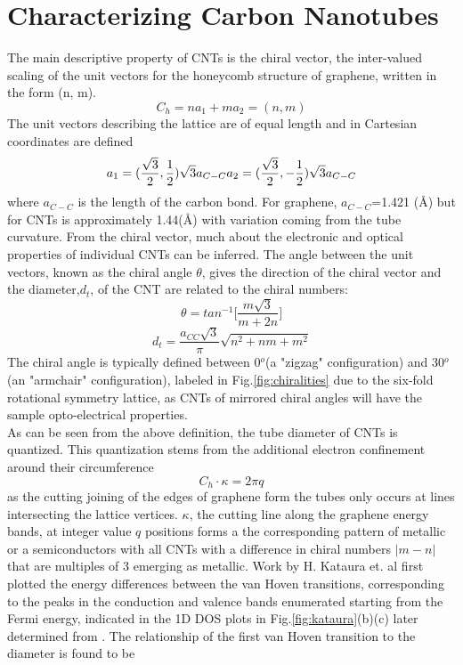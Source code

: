 \section{Characterizing Carbon Nanotubes}
The main descriptive property of CNTs is the chiral vector, the  inter-valued scaling of the unit vectors for the honeycomb structure of graphene, written in the form (n, m).
\begin{equation}
	C_h = na_1 + ma_2 = (n, m)
\end{equation}
The unit vectors describing the lattice are of equal length and in Cartesian coordinates are defined
\begin{equation}
	a_1 = (\frac{\sqrt3}{2}, \frac{1}{2})\sqrt{3}a_{C-C}\\
	a_2 = (\frac{\sqrt3}{2}, -\frac{1}{2})\sqrt{3}a_{C-C}
	\label{unit_vecs}
\end{equation}
 where $a_{C-C}$ is the length of the carbon bond. For graphene,  $a_{C-C}$=1.421 (\AA) but for CNTs is approximately 1.44(\AA) with variation coming from the tube curvature\cite{saito}. From the chiral vector, much about the electronic and optical properties of individual CNTs can be inferred. The angle between the unit vectors, known as the chiral angle $\theta$, gives the direction of the chiral vector and the diameter,$d_t$, of the CNT are related to the chiral numbers:
\begin{equation}
	\theta = tan^{-1}\Bigg[\frac{m\sqrt{3}}{m + 2n}\Bigg]
\end{equation}
\begin{equation}
	d_t = \frac{a_{CC}\sqrt{3}}{\pi} \sqrt{n^2 + nm + m^2}
\end{equation}
The chiral angle is typically defined between 0${}^o$(a "zigzag" configuration) and 30${}^o$(an "armchair" configuration), labeled in Fig.\ref{fig:chiralities} due to the six-fold rotational symmetry lattice, as CNTs of mirrored chiral angles will have the sample opto-electrical properties. \\
As can be seen from the above definition, the tube diameter of CNTs is quantized. This quantization stems from the additional electron confinement around their circumference
\begin{equation}
	C_h\cdot\kappa = 2\pi q
\end{equation}
 as the cutting joining of the edges of graphene form the tubes only occurs at lines intersecting the lattice vertices. $\kappa$, the cutting line along the graphene energy bands, at integer value $q$ positions forms a the corresponding pattern of  metallic or a semiconductors \cite{dresselhaus} with all CNTs with a difference in chiral numbers $|m-n|$ that are multiples of 3 emerging as metallic. Work by H. Kataura et. al \cite{kataura} first plotted the energy differences between the van Hoven transitions, corresponding to the peaks in the conduction and valence bands enumerated starting from the Fermi energy, indicated in the 1D DOS plots in Fig.\ref{fig:kataura}(b)(c) later determined from \cite{saito}. The relationship of the first van Hoven transition to the diameter is found to be 
